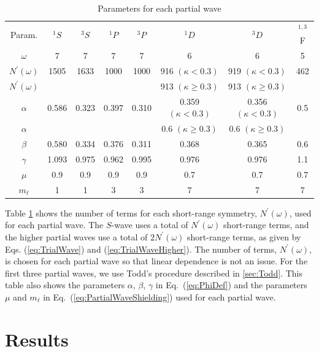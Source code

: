 \documentclass[preprint,showpacs,showkeys,preprintnumbers,amsmath,amssymb,longbibliography,pra,aps]{revtex4-1}
\begin{document}
\begin{table}[H]
  \centering
	\begin{ruledtabular}
    \begin{tabular}{cccccccc}
    Param. & $^1S$ & $^3S$ & $^1P$ & $^3P$ & $^1D$ & $^3D$ & $^{1,3}$F  \\
    \colrule
	$\omega$           & 7     & 7     & 7     & 7     & 6     & 6     & 5   \\
	$N^\prime(\omega)$ & 1505  & 1633  & 1000  & 1000  & 916 $(\kappa < 0.3)$   & 919 $(\kappa < 0.3)$   & 462   \\
	$N^\prime(\omega)$ &   &   &   &   & 913 $(\kappa \geq 0.3)$   & 913 $(\kappa \geq 0.3)$   &  \\
	$\alpha$           & 0.586 & 0.323 & 0.397 & 0.310 & 0.359 $(\kappa < 0.3)$ & 0.356 $(\kappa < 0.3)$ & 0.5  \\
	$\alpha$    &  &  &  &  & 0.6 $(\kappa \geq 0.3)$ & 0.6 $(\kappa \geq 0.3)$ &   \\
	$\beta$            & 0.580 & 0.334 & 0.376 & 0.311 & 0.368 & 0.365 & 0.6   \\
	$\gamma$           & 1.093 & 0.975 & 0.962 & 0.995 & 0.976 & 0.976 & 1.1  \\
	$\mu$              & 0.9   & 0.9   & 0.9   & 0.9   & 0.7   & 0.7   & 0.7   \\
	$m_\ell$           & 1     & 1     & 3     & 3     & 7     & 7     & 7    \\
    \end{tabular}
  \end{ruledtabular}
  \caption{Parameters for each partial wave}
  \label{tab:Nonlinear}
\end{table}

Table \ref{tab:Nonlinear} shows the number of terms for each short-range 
symmetry, $N^\prime(\omega)$, used for each partial wave. The $S$-wave uses a 
total of $N^\prime(\omega)$ short-range terms, and the higher partial waves 
use a total of $2 N^\prime(\omega)$ short-range terms, as given by Eqs.
(\ref{eq:TrialWave}) and (\ref{eq:TrialWaveHigher}).
The number of terms, $N^\prime(\omega)$, is chosen for each partial wave so
that linear dependence is not an issue. For the first three partial waves,
we use Todd's procedure described in \ref{sec:Todd}.
This table also shows the parameters $\alpha$, $\beta$,
$\gamma$ in Eq.~(\ref{eq:PhiDef}) and the parameters $\mu$ and $m_\ell$ in 
Eq.~(\ref{eq:PartialWaveShielding}) used for each partial wave.


\section{Results}
\label{sec:Results}
\end{document}

